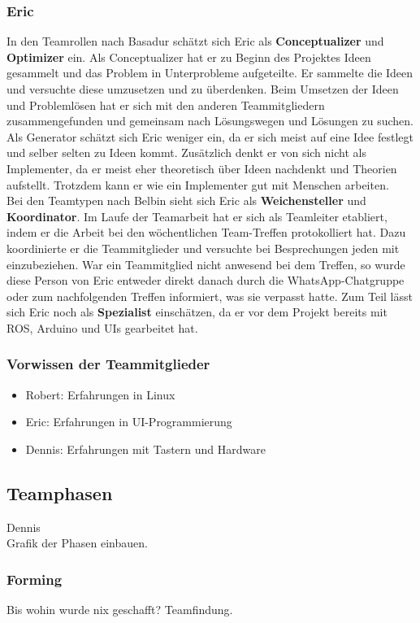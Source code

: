 \documentclass[a4paper,12pt,headsepline]{scrartcl}
\begin{document}
		\subsubsection{Eric}
		In den Teamrollen nach Basadur schätzt sich Eric als \textbf{Conceptualizer} und \textbf{Optimizer} ein. Als Conceptualizer hat er zu Beginn des Projektes Ideen gesammelt und das Problem in Unterprobleme aufgeteilte. Er sammelte die Ideen und versuchte diese umzusetzen und zu überdenken. Beim Umsetzen der Ideen und Problemlösen hat er sich mit den anderen Teammitgliedern zusammengefunden und gemeinsam nach Lösungswegen und Lösungen zu suchen. Als Generator schätzt sich Eric weniger ein, da er sich meist auf eine Idee festlegt und selber selten zu Ideen kommt. Zusätzlich denkt er von sich nicht als Implementer, da er meist eher theoretisch über Ideen nachdenkt und Theorien aufstellt. Trotzdem kann er wie ein Implementer gut mit Menschen arbeiten.\\
		Bei den Teamtypen nach Belbin sieht sich Eric als \textbf{Weichensteller} und \textbf{Koordinator}. Im Laufe der Teamarbeit hat er sich als Teamleiter etabliert, indem er die Arbeit bei den wöchentlichen Team-Treffen protokolliert hat. Dazu koordinierte er die Teammitglieder und versuchte bei Besprechungen jeden mit einzubeziehen. War ein Teammitglied nicht anwesend bei dem Treffen, so wurde diese Person von Eric entweder direkt danach durch die WhatsApp-Chatgruppe oder zum nachfolgenden Treffen informiert, was sie verpasst hatte. Zum Teil lässt sich Eric noch als \textbf{Spezialist} einschätzen, da er vor dem Projekt bereits mit ROS, Arduino und UIs gearbeitet hat.\\
		
\subsubsection{Vorwissen der Teammitglieder}
			\begin{itemize}
				\item Robert: Erfahrungen in Linux
				\item Eric: Erfahrungen in UI-Programmierung
				\item Dennis: Erfahrungen mit Tastern und Hardware
			\end{itemize}
	\subsection{Teamphasen}
		Dennis\\
		Grafik der Phasen einbauen.
	\subsubsection{Forming}
		Bis wohin wurde nix geschafft? Teamfindung.
\end{document}
